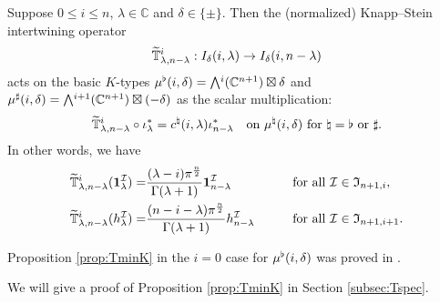 \begin{proposition}
\label{prop:TminK}
Suppose $0 \le i \le n$, 
 $\lambda \in {\mathbb{C}}$
 and $\delta \in \{ \pm \}$.  
Then the (normalized) Knapp--Stein intertwining operator
\[
\widetilde{{\mathbb{T}}}_{{\lambda},{n-\lambda}}^{{i}}
:
I_{\delta}(i,\lambda) \to I_{\delta}(i,n-\lambda)
\]
acts on the 
basic $K$-types
 $\mub (i,\delta)=\Exterior^i({\mathbb{C}}^{n+1}) \boxtimes \delta$
 and 
 $\mus(i,\delta)=\Exterior^{i+1}({\mathbb{C}}^{n+1}) \boxtimes (-\delta)$
 as the scalar multiplication:
\[
  \widetilde{{\mathbb{T}}}_{{\lambda},{n-\lambda}}^{{i}}  \circ \iota_{\lambda}^{\ast}
  =
  c^{\natural}(i,\lambda)\iota_{n-\lambda}^{\ast}
\quad
  \text{on $\mu^{\natural}(i,\delta)$
        for $\natural = \flat$ or $\sharp$}.  
\]
In other words, 
we have 
\begin{alignat*}{2}
\widetilde{{\mathbb{T}}}_{{\lambda},{n-\lambda}}^{{i}}({\bf{1}}_{\lambda}^{\mathcal{I}})
=&
\frac{(\lambda-i)\pi^{\frac n 2}}{\Gamma(\lambda+1)}
{\bf{1}}_{n-\lambda}^{\mathcal{I}}  
\quad
&&\text{for all ${\mathcal{I}} \in {\mathfrak {I}}_{n+1,i}$}, 
\\
\widetilde{{\mathbb{T}}}_{{\lambda},{n-\lambda}}^{{i}}
(h_{\lambda}^{\mathcal{I}})
=&
\frac{(n-i-\lambda) \pi^{\frac n 2}}{\Gamma(\lambda+1)}
h_{n-\lambda}^{\mathcal{I}}
\qquad
&&\text{for all ${\mathcal{I}} \in {\mathfrak{I}}_{n+1,i+1}$}.  
\end{alignat*}
\end{proposition}



\begin{remark}
Proposition \ref{prop:TminK}
 in the $i=0$ case for $\mu^{\flat} (i,\delta)$
 was proved in \cite[Prop.~4.6]{sbon}.  
\end{remark}
We will give a proof of Proposition \ref{prop:TminK}
 in Section \ref{subsec:Tspec}.  

